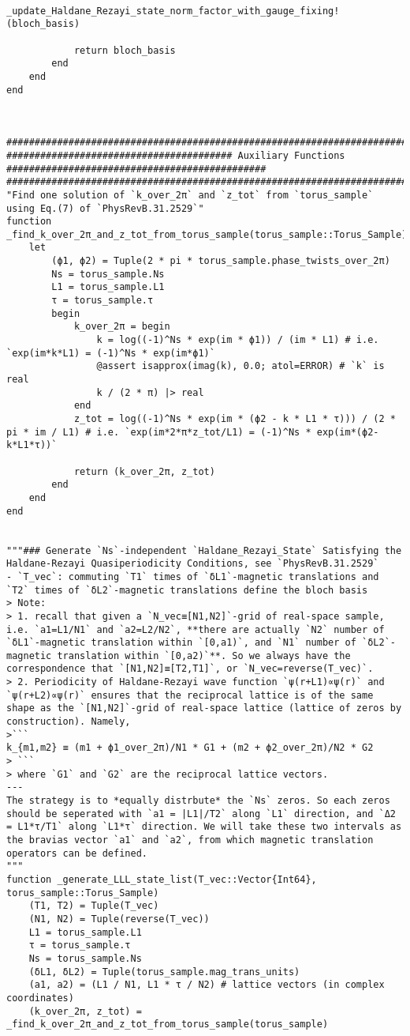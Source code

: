 \begin{verbatim}
            _update_Haldane_Rezayi_state_norm_factor_with_gauge_fixing!(bloch_basis)

            return bloch_basis
        end
    end
end



###########################################################################################################
######################################## Auxiliary Functions ##############################################
###########################################################################################################
"Find one solution of `k_over_2π` and `z_tot` from `torus_sample` using Eq.(7) of `PhysRevB.31.2529`"
function _find_k_over_2π_and_z_tot_from_torus_sample(torus_sample::Torus_Sample)
    let
        (ϕ1, ϕ2) = Tuple(2 * pi * torus_sample.phase_twists_over_2π)
        Ns = torus_sample.Ns
        L1 = torus_sample.L1
        τ = torus_sample.τ
        begin
            k_over_2π = begin
                k = log((-1)^Ns * exp(im * ϕ1)) / (im * L1) # i.e. `exp(im*k*L1) = (-1)^Ns * exp(im*ϕ1)`
                @assert isapprox(imag(k), 0.0; atol=ERROR) # `k` is real
                k / (2 * π) |> real
            end
            z_tot = log((-1)^Ns * exp(im * (ϕ2 - k * L1 * τ))) / (2 * pi * im / L1) # i.e. `exp(im*2*π*z_tot/L1) = (-1)^Ns * exp(im*(ϕ2-k*L1*τ))`

            return (k_over_2π, z_tot)
        end
    end
end


"""### Generate `Ns`-independent `Haldane_Rezayi_State` Satisfying the Haldane-Rezayi Quasiperiodicity Conditions, see `PhysRevB.31.2529`
- `T_vec`: commuting `T1` times of `δL1`-magnetic translations and `T2` times of `δL2`-magnetic translations define the bloch basis
> Note: 
> 1. recall that given a `N_vec≡[N1,N2]`-grid of real-space sample, i.e. `a1=L1/N1` and `a2=L2/N2`, **there are actually `N2` number of `δL1`-magnetic translation within `[0,a1)`, and `N1` number of `δL2`-magnetic translation within `[0,a2)`**. So we always have the correspondence that `[N1,N2]≡[T2,T1]`, or `N_vec=reverse(T_vec)`. 
> 2. Periodicity of Haldane-Rezayi wave function `ψ(r+L1)∝ψ(r)` and `ψ(r+L2)∝ψ(r)` ensures that the reciprocal lattice is of the same shape as the `[N1,N2]`-grid of real-space lattice (lattice of zeros by construction). Namely,
>```
k_{m1,m2} ≡ (m1 + ϕ1_over_2π)/N1 * G1 + (m2 + ϕ2_over_2π)/N2 * G2
> ```
> where `G1` and `G2` are the reciprocal lattice vectors.
---
The strategy is to *equally distrbute* the `Ns` zeros. So each zeros should be seperated with `a1 = |L1|/T2` along `L1` direction, and `Δ2 = L1*τ/T1` along `L1*τ` direction. We will take these two intervals as the bravias vector `a1` and `a2`, from which magnetic translation operators can be defined.
"""
function _generate_LLL_state_list(T_vec::Vector{Int64}, torus_sample::Torus_Sample)
    (T1, T2) = Tuple(T_vec)
    (N1, N2) = Tuple(reverse(T_vec))
    L1 = torus_sample.L1
    τ = torus_sample.τ
    Ns = torus_sample.Ns
    (δL1, δL2) = Tuple(torus_sample.mag_trans_units)
    (a1, a2) = (L1 / N1, L1 * τ / N2) # lattice vectors (in complex coordinates)
    (k_over_2π, z_tot) = _find_k_over_2π_and_z_tot_from_torus_sample(torus_sample)


\end{verbatim}
